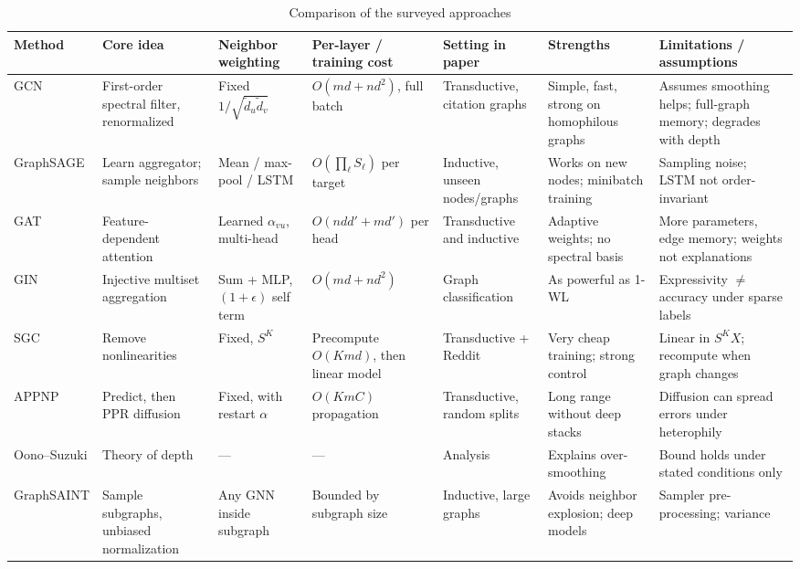 \documentclass[conference]{IEEEtran}
\begin{document}
\begin{table}[!t]
\centering
\scriptsize
\renewcommand{\arraystretch}{1.15}
\caption{Comparison of the surveyed approaches}
\label{tab:1}
\begin{tabularx}{\textwidth}{l>{\raggedright\arraybackslash}X>{\raggedright\arraybackslash}X>{\raggedright\arraybackslash}X>{\raggedright\arraybackslash}X>{\raggedright\arraybackslash}X>{\raggedright\arraybackslash}X}
\hline
\textbf{Method} & \textbf{Core idea} & \textbf{Neighbor weighting} & \textbf{Per-layer / training cost} & \textbf{Setting in paper} & \textbf{Strengths} & \textbf{Limitations / assumptions} \\
\hline
GCN \cite{b1} & First-order spectral filter, renormalized & Fixed \(1/\sqrt{\tilde d_u\tilde d_v}\) & \(O(md + nd^2)\), full batch & Transductive, citation graphs & Simple, fast, strong on homophilous graphs & Assumes smoothing helps; full-graph memory; degrades with depth \\
GraphSAGE \cite{b2} & Learn aggregator; sample neighbors & Mean / max-pool / LSTM & \(O(\prod_\ell S_\ell)\) per target & Inductive, unseen nodes/graphs & Works on new nodes; minibatch training & Sampling noise; LSTM not order-invariant \\
GAT \cite{b3} & Feature-dependent attention & Learned \(\alpha_{vu}\), multi-head & \(O(nd d' + md')\) per head & Transductive and inductive & Adaptive weights; no spectral basis & More parameters, edge memory; weights not explanations \\
GIN \cite{b4} & Injective multiset aggregation & Sum + MLP, \((1+\epsilon)\) self term & \(O(md + nd^2)\) & Graph classification & As powerful as 1-WL & Expressivity \ensuremath{\neq} accuracy under sparse labels \\
SGC \cite{b5} & Remove nonlinearities & Fixed, \(S^K\) & Precompute \(O(Kmd)\), then linear model & Transductive + Reddit & Very cheap training; strong control & Linear in \(S^KX\); recompute when graph changes \\
APPNP \cite{b6} & Predict, then PPR diffusion & Fixed, with restart \(\alpha\) & \(O(KmC)\) propagation & Transductive, random splits & Long range without deep stacks & Diffusion can spread errors under heterophily \\
Oono--Suzuki \cite{b7} & Theory of depth & --- & --- & Analysis & Explains over-smoothing & Bound holds under stated conditions only \\
GraphSAINT \cite{b8} & Sample subgraphs, unbiased normalization & Any GNN inside subgraph & Bounded by subgraph size & Inductive, large graphs & Avoids neighbor explosion; deep models & Sampler pre-processing; variance \\

\end{tabularx}
\end{table}
\end{document}
